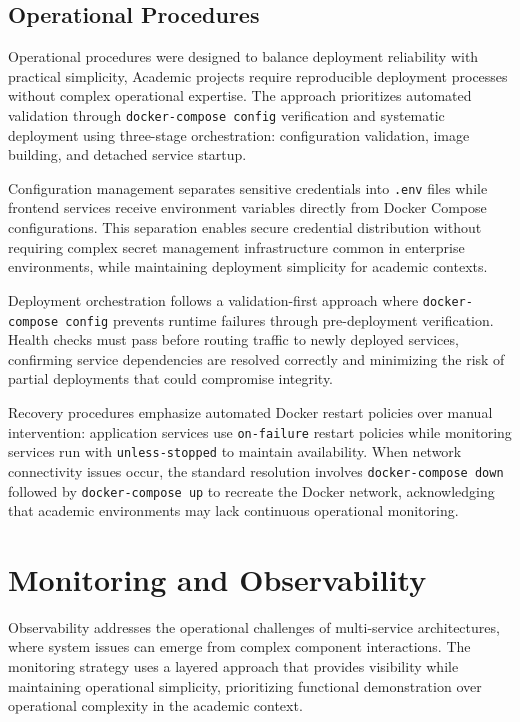 \subsection{Operational Procedures} \label{subsection:operational_procedures}

Operational procedures were designed to balance deployment reliability with practical simplicity, Academic projects require reproducible deployment processes without complex operational expertise. The approach prioritizes automated validation through \texttt{docker-compose config} verification and systematic deployment using three-stage orchestration: configuration validation, image building, and detached service startup.

Configuration management separates sensitive credentials into \texttt{.env} files while frontend services receive environment variables directly from Docker Compose configurations. This separation enables secure credential distribution without requiring complex secret management infrastructure common in enterprise environments, while maintaining deployment simplicity for academic contexts.

Deployment orchestration follows a validation-first approach where \texttt{docker-compose config} prevents runtime failures through pre-deployment verification. Health checks must pass before routing traffic to newly deployed services, confirming service dependencies are resolved correctly and minimizing the risk of partial deployments that could compromise integrity.

Recovery procedures emphasize automated Docker restart policies over manual intervention: application services use \texttt{on-failure} restart policies while monitoring services run with \texttt{unless-stopped} to maintain availability. When network connectivity issues occur, the standard resolution involves \texttt{docker-compose down} followed by \texttt{docker-compose up} to recreate the Docker network, acknowledging that academic environments may lack continuous operational monitoring.

\section{Monitoring and Observability} \label{section:monitoring_observability}

Observability addresses the operational challenges of multi-service architectures, where system issues can emerge from complex component interactions. The monitoring strategy uses a layered approach that provides visibility while maintaining operational simplicity, prioritizing functional demonstration over operational complexity in the academic context.

